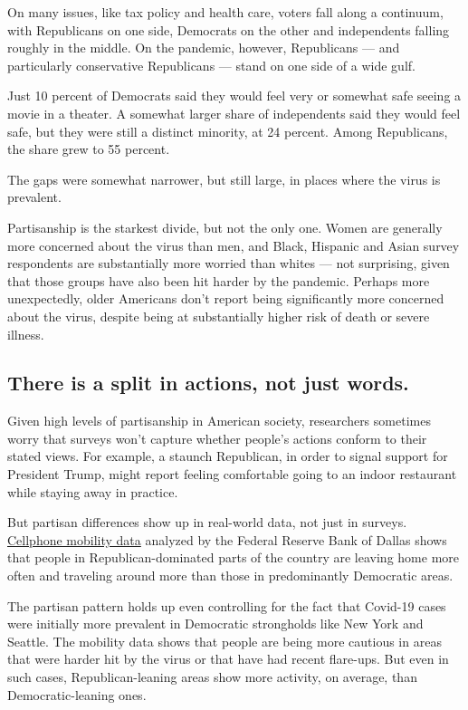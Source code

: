 On many issues, like tax policy and health care, voters fall along a
continuum, with Republicans on one side, Democrats on the other and
independents falling roughly in the middle. On the pandemic, however,
Republicans --- and particularly conservative Republicans --- stand on
one side of a wide gulf.

Just 10 percent of Democrats said they would feel very or somewhat safe
seeing a movie in a theater. A somewhat larger share of independents
said they would feel safe, but they were still a distinct minority, at
24 percent. Among Republicans, the share grew to 55 percent.

The gaps were somewhat narrower, but still large, in places where the
virus is prevalent.

Partisanship is the starkest divide, but not the only one. Women are
generally more concerned about the virus than men, and Black, Hispanic
and Asian survey respondents are substantially more worried than whites
--- not surprising, given that those groups have also been hit harder by
the pandemic. Perhaps more unexpectedly, older Americans don't report
being significantly more concerned about the virus, despite being at
substantially higher risk of death or severe illness.

\hypertarget{there-is-a-split-in-actions-not-just-words}{%
\subsection{There is a split in actions, not just
words.}\label{there-is-a-split-in-actions-not-just-words}}

Given high levels of partisanship in American society, researchers
sometimes worry that surveys won't capture whether people's actions
conform to their stated views. For example, a staunch Republican, in
order to signal support for President Trump, might report feeling
comfortable going to an indoor restaurant while staying away in
practice.

But partisan differences show up in real-world data, not just in
surveys.
\href{https://www.dallasfed.org/research/economics/2020/0521}{Cellphone
mobility data} analyzed by the Federal Reserve Bank of Dallas shows that
people in Republican-dominated parts of the country are leaving home
more often and traveling around more than those in predominantly
Democratic areas.

The partisan pattern holds up even controlling for the fact that
Covid-19 cases were initially more prevalent in Democratic strongholds
like New York and Seattle. The mobility data shows that people are being
more cautious in areas that were harder hit by the virus or that have
had recent flare-ups. But even in such cases, Republican-leaning areas
show more activity, on average, than Democratic-leaning ones.


